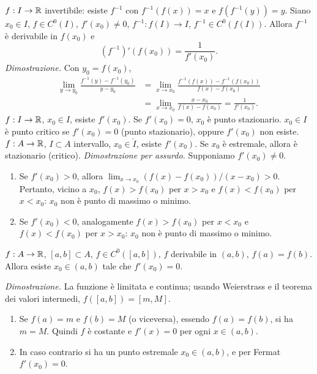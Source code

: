 $f:I\to\mathbb R$ invertibile: esiste $f^{-1}$ con $f^{-1}(f(x))=x$ e $f(f^{-1}(y))=y$.
Siano $x_0\in I$, $f\in C^0(I)$, $f'(x_0)\ne0$, $f^{-1}:f(I)\to I$, $f^{-1}\in C^0(f(I))$.
Allora $f^{-1}$ è derivabile in $f(x_0)$ e
\[(f^{-1})'(f(x_0))=\frac1{f'(x_0)}.\]
\textit{Dimostrazione.} Con $y_0=f(x_0)$,
\begin{align*}
\lim_{y\to y_0}\frac{f^{-1}(y)-f^{-1}(y_0)}{y-y_0}
&=\lim_{x\to x_0}\frac{f^{-1}(f(x))-f^{-1}(f(x_0))}{f(x)-f(x_0)}\\
&=\lim_{x\to x_0}\frac{x-x_0}{f(x)-f(x_0)}=\frac1{f'(x_0)}.
\end{align*}
$f:I\to\mathbb R$, $x_0\in I$, esiste $f'(x_0)$. Se $f'(x_0)=0$, $x_0$ è punto stazionario.
$x_0\in I$ è punto critico se $f'(x_0)=0$ (punto stazionario), oppure $f'(x_0)$ non esiste.
$f:A\to\mathbb R$, $I\subset A$ intervallo, $x_0\in\mathring I$, esiste $f'(x_0)$. Se $x_0$ è estremale, allora è stazionario (critico).
\textit{Dimostrazione per assurdo.} Supponiamo $f'(x_0)\ne0$.
\begin{enumerate}
\item Se $f'(x_0)>0$, allora $\lim_{x\to x_0}(f(x)-f(x_0))/(x-x_0)>0$. Pertanto, vicino a $x_0$, $f(x)>f(x_0)$ per $x>x_0$ e $f(x)<f(x_0)$ per $x<x_0$: $x_0$ non è punto di massimo o minimo.
\item Se $f'(x_0)<0$, analogamente $f(x)>f(x_0)$ per $x<x_0$ e $f(x)<f(x_0)$ per $x>x_0$: $x_0$ non è punto di massimo o minimo.
\end{enumerate}
$f:A\to\mathbb R$, $[a,b]\subset A$, $f\in C^0([a,b])$, $f$ derivabile in $(a,b)$, $f(a)=f(b)$.
Allora esiste $x_0\in(a,b)$ tale che $f'(x_0)=0$.
\begin{center}\end{center}
\textit{Dimostrazione.} La funzione è limitata e continua; usando Weierstrass e il teorema dei valori intermedi, $f([a,b])=[m,M]$.
\begin{enumerate}
\item Se $f(a)=m$ e $f(b)=M$ (o viceversa), essendo $f(a)=f(b)$, si ha $m=M$. Quindi $f$ è costante e $f'(x)=0$ per ogni $x\in(a,b)$.
\item In caso contrario si ha un punto estremale $x_0\in(a,b)$, e per Fermat $f'(x_0)=0$.
\end{enumerate}
